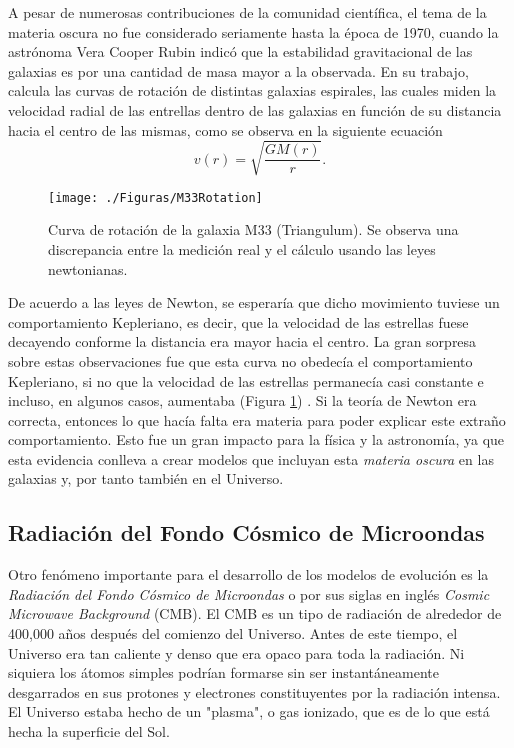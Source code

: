 \documentclass[a4paper,openright,12pt]{book}
\begin{document}
A pesar de numerosas contribuciones de la comunidad científica, el tema de la materia oscura no fue considerado seriamente hasta la época de 1970, cuando la astrónoma Vera Cooper Rubin \cite{1.1.2} indicó que la estabilidad gravitacional de las galaxias es por una cantidad de masa mayor a la observada. En su trabajo, calcula las curvas de rotación de distintas galaxias espirales, las cuales miden la velocidad radial de las entrellas dentro de las galaxias en función de su distancia hacia el centro de las mismas, como se observa en la siguiente ecuación
\begin{equation}
v (r)
=
\sqrt{\frac{G M (r)}{r}}.\label{eqn 1.42}
\end{equation} 
\begin{figure}
\centering
    \texttt{[image: ./Figuras/M33Rotation]}
  \caption{\footnotesize{Curva de rotación de la galaxia M33 (Triangulum). Se observa una discrepancia entre la medición real y el cálculo usando las leyes newtonianas.}}
  \label{fig 1.2}
\end{figure}
De acuerdo a las leyes de Newton, se esperaría que dicho movimiento tuviese un comportamiento Kepleriano, es decir, que la velocidad de las estrellas fuese decayendo conforme la distancia era mayor hacia el centro. La gran sorpresa sobre estas observaciones fue que esta curva no obedecía el comportamiento Kepleriano, si no que la velocidad de las estrellas permanecía casi constante e incluso, en algunos casos, aumentaba (Figura \ref{fig 1.2}) . Si la teoría de Newton era correcta, entonces lo que hacía falta era materia para poder explicar este extraño comportamiento. Esto fue un gran impacto para la física y la astronomía, ya que esta evidencia conlleva a crear modelos que incluyan esta \textit{materia oscura} en las galaxias y, por tanto también en el Universo.

\subsection*{Radiación del Fondo Cósmico de Microondas}
Otro fenómeno importante para el desarrollo de los modelos de evolución es la \textit{Radiación del Fondo Cósmico de Microondas} o por sus siglas en inglés \textit{Cosmic Microwave Background} (CMB). El CMB es un tipo de radiación de alrededor de 400,000 años después del comienzo del Universo. Antes de este tiempo, el Universo era tan caliente y denso que era opaco para toda la radiación. Ni siquiera los átomos simples podrían formarse sin ser instantáneamente desgarrados en sus protones y electrones constituyentes por la radiación intensa. El Universo estaba hecho de un "plasma", o gas ionizado, que es de lo que está hecha la superficie del Sol.
\end{document}
